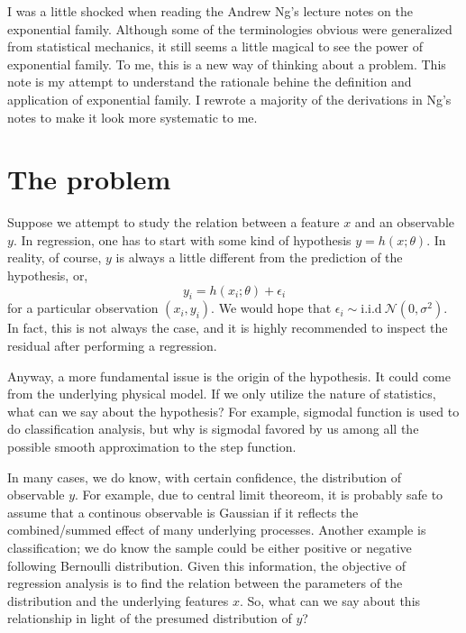 I was a little shocked when reading the Andrew Ng's lecture notes on the exponential family. Although some of the
terminologies obvious were generalized from statistical mechanics, it still seems a little magical to see the power of
exponential family. To me, this is a new way of thinking about a problem. This note is my attempt to understand
the rationale behine the definition and application of exponential family. I rewrote a majority of the derivations in Ng's notes to make it look more systematic to me.

\section{The problem}
Suppose we attempt to study the relation between a feature $x$ and an observable $y$. In regression, one has to start with some kind of hypothesis $y=h(x; \theta)$. In reality, of course, $y$ is always a little different from the prediction of the hypothesis, or,
\begin{equation}
y_i = h(x_i;\theta) + \epsilon_i
\end{equation}
for a particular observation $(x_i, y_i)$. We would hope that $\epsilon_i\sim\mathrm{i.i.d}\ \mathcal{N}(0, \sigma^2)$.
In fact, this is not always the case, and it is highly recommended to inspect the residual after performing a regression.

Anyway, a more fundamental issue is the origin of the hypothesis. It could come from the underlying physical model. If we only utilize the nature of statistics, what can we say about the hypothesis? For example, sigmodal function is used to do classification analysis, but why is sigmodal favored by us among all the possible smooth approximation to the step function.

In many cases, we do know, with certain confidence, the distribution of observable $y$. For example, due to central limit theoreom, it is probably safe to assume that a continous observable is Gaussian if it reflects the combined/summed effect of many underlying processes. Another example is classification; we do know the sample could be either positive or negative following Bernoulli distribution. Given this information, the objective of regression analysis is to find the relation between the parameters of the distribution and the underlying features $x$. So, what can we say about this relationship in light of the presumed distribution of $y$? 

